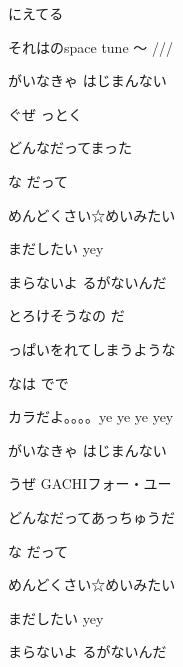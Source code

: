 \documentclass[a4paper,tate,twocolumn,12pt]{ltjtarticle}
\begin{document}
\begin{flushleft}
\begin{minipage}{\linewidth}
にえてる

それはのspace tune 〜 ///
\end{minipage}

\vspace{2em}

\noindent\begin{minipage}{\linewidth}
がいなきゃ はじまんない

ぐぜ っとく

どんなだってまった

な だって

めんどくさい☆めいみたい

まだしたい yey

まらないよ るがないんだ
\end{minipage}

\vspace{2em}

\noindent\begin{minipage}{\linewidth}
とろけそうなの だ

っぱいをれてしまうような

なは でで

カラだよ。。。。ye ye ye yey
\end{minipage}

\vspace{2em}

\noindent\begin{minipage}{\linewidth}
がいなきゃ はじまんない

うぜ GACHIフォー・ユー

どんなだってあっちゅうだ

な だって

めんどくさい☆めいみたい

まだしたい yey

まらないよ るがないんだ
\end{minipage}

\end{flushleft}
\end{document}
